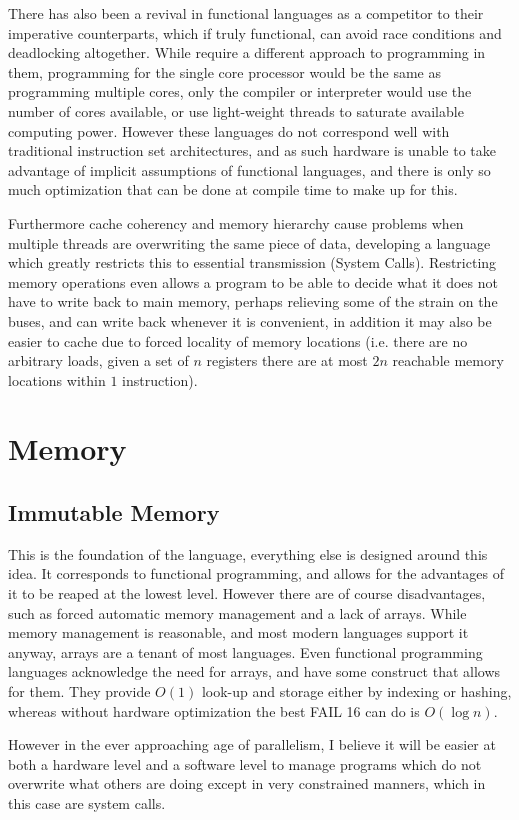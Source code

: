 \documentclass[12pt,letterpaper]{report}
\begin{document}
There has also been a revival in functional languages as a competitor to their imperative counterparts, which if truly functional, can avoid race conditions and deadlocking altogether. While require a different approach to programming in them, programming for the single core processor would be the same as programming multiple cores, only the compiler or interpreter would use the number of cores available, or use light-weight threads to saturate available computing power. However these languages do not correspond well with traditional instruction set architectures, and as such hardware is unable to take advantage of implicit assumptions of functional languages, and there is only so much optimization that can be done at compile time to make up for this.

Furthermore cache coherency and memory hierarchy cause problems when multiple threads are overwriting the same piece of data, developing a language which greatly restricts this to essential transmission (System Calls). Restricting memory operations even allows a program to be able to decide what it does not have to write back to main memory, perhaps relieving some of the strain on the buses, and can write back whenever it is convenient, in addition it may also be easier to cache due to forced locality of memory locations (i.e. there are no arbitrary loads, given a set of $n$ registers there are at most $2n$ reachable memory locations within $1$ instruction).
\section{Memory}
\subsection{Immutable Memory}
This is the foundation of the language, everything else is designed around this idea. It corresponds to functional programming, and allows for the advantages of it to be reaped at the lowest level. However there are of course disadvantages, such as forced automatic memory management and a lack of arrays. While memory management is reasonable, and most modern languages support it anyway, arrays are a tenant of most languages. Even functional programming languages acknowledge the need for arrays, and have some construct that allows for them. They provide $O\left(1\right)$ look-up and storage either by indexing or hashing, whereas without hardware optimization the best FAIL 16 can do is $O\left(\log n\right)$.

However in the ever approaching age of parallelism, I believe it will be easier at both a hardware level and a software level to manage programs which do not overwrite what others are doing except in very constrained manners, which in this case are system calls.
\end{document}
